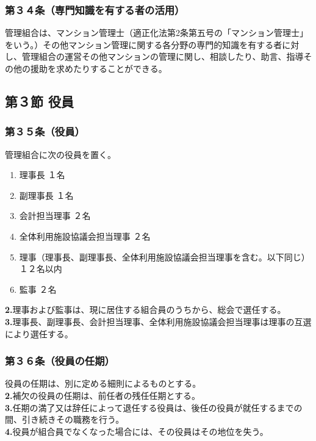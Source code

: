 \documentclass[12pt,uplatex]{jsarticle}
\begin{document}
\subsubsection*{第３４条（専門知識を有する者の活用）}
管理組合は、マンション管理士（適正化法第2条第五号の「マンション管理士」をいう。）その他マンション管理に関する各分野の専門的知識を有する者に対し、管理組合の運営その他マンションの管理に関し、相談したり、助言、指導その他の援助を求めたりすることができる。

\begin{center}
\subsection*{第３節 役員}
\end{center}
\subsubsection*{第３５条（役員）}
管理組合に次の役員を置く。
\begin{enumerate}
\item 理事長				１名
\item 副理事長				１名
\item 会計担当理事				２名
\item 全体利用施設協議会担当理事		２名
\item 理事（理事長、副理事長、全体利用施設協議会担当理事を含む。以下同じ） １２名以内
\item 監事				２名
\end{enumerate}
\textbf{2.}理事および監事は、現に居住する組合員のうちから、総会で選任する。\\
\textbf{3.}理事長、副理事長、会計担当理事、全体利用施設協議会担当理事は理事の互選により選任する。
\subsubsection*{第３６条（役員の任期）}
役員の任期は、別に定める細則によるものとする。\\
\textbf{2.}補欠の役員の任期は、前任者の残任任期とする。\\
\textbf{3.}任期の満了又は辞任によって退任する役員は、後任の役員が就任するまでの間、引き続きその職務を行う。\\
\textbf{4.}役員が組合員でなくなった場合には、その役員はその地位を失う。
\end{document}
